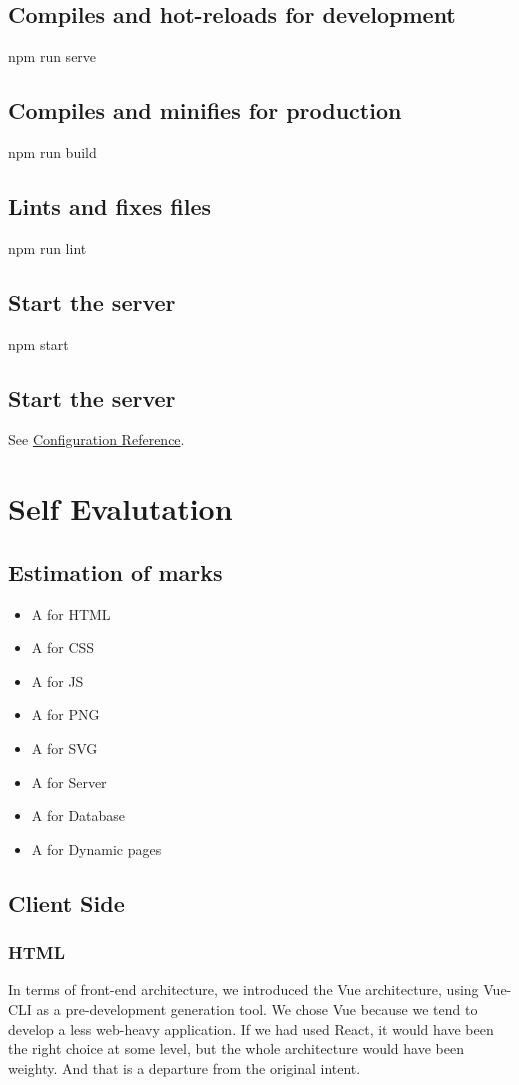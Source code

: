 \documentclass[11pt]{article}
\begin{document}
\begin{spacing}{1.0}
	\subsection{Compiles and hot-reloads for development}
	npm run serve
	\subsection{Compiles and minifies for production}
	npm run build
	\subsection{Lints and fixes files}
	npm run lint
	\subsection{Start the server}
	npm start
	\subsection{Start the server}
	See \href{https://cli.vuejs.org/config/}{Configuration Reference}.
		
	\section{Self Evalutation}
	\subsection{Estimation of marks}
\begin{itemize}
	\item A for HTML
	\item A for CSS
	\item A for JS
	\item A for PNG	
	\item A for SVG
	\item A for Server
	\item A for Database
	\item A for Dynamic pages
\end{itemize}
	\subsection{Client Side}
	\subsubsection{HTML}
	In terms of front-end architecture, we introduced the Vue architecture, using Vue-CLI as a pre-development generation tool. We chose Vue because we tend to develop a less web-heavy application. If we had used React, it would have been the right choice at some level, but the whole architecture would have been weighty. And that is a departure from the original intent.
	

\end{spacing}
\end{document}
